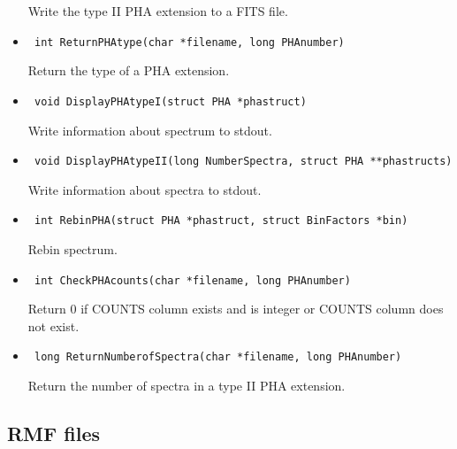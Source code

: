 \documentclass[11pt]{book}
\begin{document}
\begin{itemize}
               Write the type II PHA extension to a FITS file.

\item      \begin{verbatim} int ReturnPHAtype(char *filename, long PHAnumber)\end{verbatim}

               Return the type of a PHA extension.

\item      \begin{verbatim} void DisplayPHAtypeI(struct PHA *phastruct)\end{verbatim}

               Write information about spectrum to stdout.

\item      \begin{verbatim} void DisplayPHAtypeII(long NumberSpectra, struct PHA **phastructs)\end{verbatim}

               Write information about spectra to stdout.

\item      \begin{verbatim} int RebinPHA(struct PHA *phastruct, struct BinFactors *bin)\end{verbatim}

               Rebin spectrum.

\item      \begin{verbatim} int CheckPHAcounts(char *filename, long PHAnumber)\end{verbatim}

               Return 0 if COUNTS column exists and is integer 
               or COUNTS column does not exist.

\item      \begin{verbatim} long ReturnNumberofSpectra(char *filename, long PHAnumber)\end{verbatim}

               Return the number of spectra in a type II PHA extension.

\end{itemize}

\subsection{RMF files}
\end{document}
